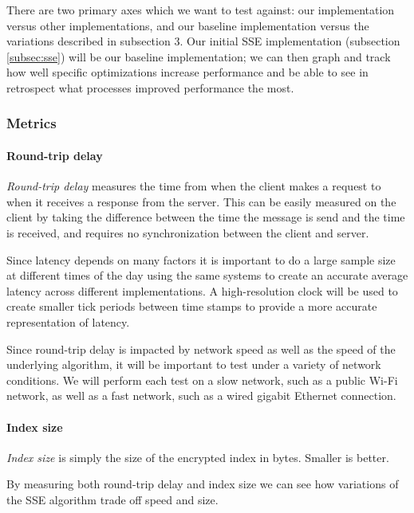 
There are two primary axes which we want to test against: our implementation versus other implementations, and our baseline implementation versus the variations described in subsection 3.
Our initial SSE implementation (subsection \ref{subsec:sse}) will be our baseline implementation;
we can then graph and track how well specific optimizations increase performance and be able to see in retrospect what processes improved performance the most.

\subsubsection {Metrics}

\paragraph {Round-trip delay}

\textit{Round-trip delay} measures the time from when the client makes a request to when it receives a response from the server.
This can be easily measured on the client by taking the difference between the time the message is send and the time is received, and requires no synchronization between the client and server.

Since latency depends on many factors it is important to do a large sample size at different times of the day using the same systems to create an accurate average latency across different implementations. 
A high-resolution clock will be used to create smaller tick periods between time stamps to provide a more accurate representation of latency. 

Since round-trip delay is impacted by network speed as well as the speed of the underlying algorithm, it will be important to test under a variety of network conditions.
We will perform each test on a slow network, such as a public Wi-Fi network, as well as a fast network, such as a wired gigabit Ethernet connection.

\paragraph {Index size} \textit{Index size} is simply the size of the encrypted index in bytes. Smaller is better.

By measuring both round-trip delay and index size we can see how variations of the SSE algorithm trade off speed and size.


